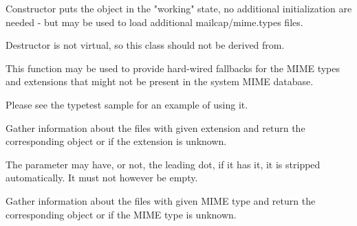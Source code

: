 \label{wxmimetypesmanagerctor}


Constructor puts the object in the "working" state, no additional initialization
are needed - but  may be used to load
additional mailcap/mime.types files.


\label{wxmimetypesmanagerdtor}


Destructor is not virtual, so this class should not be derived from.


\label{wxmimetypesmanageraddfallbacks}


This function may be used to provide hard-wired fallbacks for the MIME types
and extensions that might not be present in the system MIME database.


Please see the typetest sample for an example of using it.


\label{wxmimetypesmanagergetfiletypefromextension}


Gather information about the files with given extension and return the
corresponding  object or \NULL if the extension
is unknown.

The  parameter may have, or not, the leading dot, if it has it,
it is stripped automatically. It must not however be empty.


\label{wxmimetypesmanagergetfiletypefrommimetype}


Gather information about the files with given MIME type and return the
corresponding  object or \NULL if the MIME type
is unknown.


\label{wxmimetypesmanagerisoftype}

